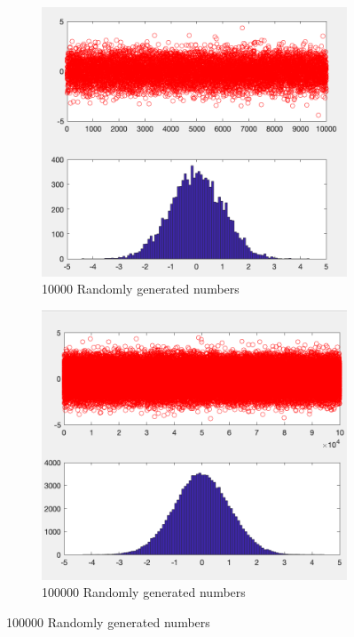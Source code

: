 \documentclass{article}
\begin{document}
\begin{figure}[h]
    \begin{subfigure}[h]{0.4\linewidth}
        \includegraphics[width=\linewidth]{./imgs/q1a_10000.png}
        \caption{10000 Randomly generated numbers}
    \end{subfigure}
    \hfill
    \begin{subfigure}[h]{0.4\linewidth}
        \includegraphics[width=\linewidth]{./imgs/q1a_100000.png}
        \caption{100000 Randomly generated numbers}
    \end{subfigure}
\end{figure}
\end{document}
